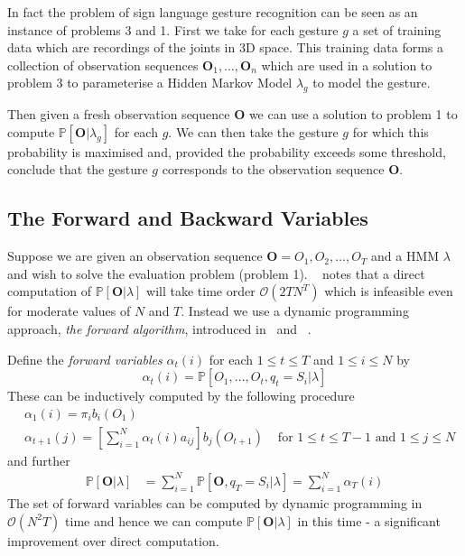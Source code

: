 In fact the problem of sign language gesture recognition can be seen as an instance of problems 3 and 1. First we take for each gesture $g$ a set of training data which are recordings of the joints in 3D space. This training data forms a collection of observation sequences $\bm{O}_1, \dots, \bm{O}_n$ which are used in a solution to problem 3 to parameterise a Hidden Markov Model $\lambda_g$ to model the gesture.

Then given a fresh observation sequence $\bm{O}$ we can use a solution to problem 1 to compute $\mathbb{P}[\bm{O} | \lambda_g]$ for each $g$. We can then take the gesture $g$ for which this probability is maximised and, provided the probability exceeds some threshold, conclude that the gesture $g$ corresponds to the observation sequence $\bm{O}$. 

\subsection{The Forward and Backward Variables}
Suppose we are given an observation sequence $\bm{O} = O_1,O_2,\dots,O_T$ and a HMM $\lambda$ and wish to solve the evaluation problem (problem 1). ~\citet{rabiner1989tutorial} notes that a direct computation of $\mathbb{P}[\bm{O}|\lambda]$ will take time order $\mathcal{O}(2TN^T)$ which is infeasible even for moderate values of $N$ and $T$. Instead we use a dynamic programming approach, \emph{the forward algorithm}, introduced in~\citet{baum1968growth} and ~\cite{baum1970maximization}.

Define the \emph{forward variables} $\alpha_t(i)$ for each $1\leq t \leq T$ and $1 \leq i \leq N$ by
\begin{equation*}
\alpha_t(i) = \mathbb{P}[O_1, \dots, O_t, q_t=S_i | \lambda]
\end{equation*}
These can be inductively computed by the following procedure 
\begin{align*}
&\alpha_1(i) = \pi_ib_i(O_1)\\
&\alpha_{t+1}(j) = \left[ \sum_{i=1}^{N} \alpha_{t}(i)a_{ij} \right]b_j(O_{t+1}) &\text{ for $1\leq t \leq T-1$ and $1 \leq j \leq N$}
\end{align*}
and further
\begin{align*}
\mathbb{P}[\bm{O} | \lambda] &= \sum_{i=1}^N \mathbb{P}[\bm{O}, q_T = S_i | \lambda] = \sum_{i=1}^N \alpha_T(i)
\end{align*}
The set of forward variables can be computed by dynamic programming in $\mathcal{O}(N^2T)$ time and hence we can compute $\mathbb{P}[\bm{O} | \lambda]$ in this time -  a significant improvement over direct computation.

